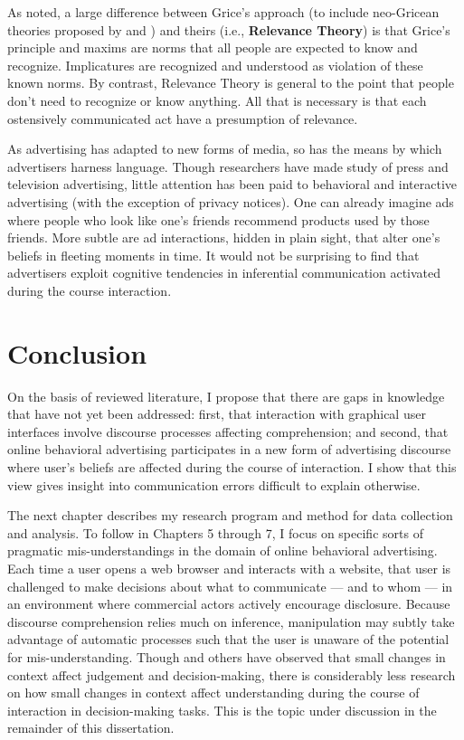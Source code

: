 As  \cite{Sperber:1986uk}  noted, a large difference between Grice's approach (to include neo-Gricean theories proposed by  \citealp{Horn:2006va} and \citealp{Levinson:2000ud})  and theirs  (i.e., \textbf{Relevance Theory})  is that Grice's principle and maxims are norms that all people are expected to know and recognize. Implicatures are recognized and understood as violation of these known norms. By contrast, Relevance Theory is general to the point that people don't need to recognize or know anything. All that is necessary is that each ostensively communicated act have a presumption of relevance.

As advertising has adapted to new forms of media, so has the means by which advertisers harness language. Though researchers have made study of press and television advertising, little attention has been paid to behavioral and interactive advertising (with the exception of privacy notices). One can already imagine ads where people who look like one's friends recommend products used by those friends. More subtle are ad interactions, hidden in plain sight, that alter one's beliefs in fleeting moments in time. It would not be surprising to find that advertisers exploit cognitive tendencies in inferential communication activated during the course interaction.

\section{Conclusion}
\label{conclusion}

On the basis of reviewed literature, I propose that there are gaps in knowledge that have not yet been addressed: first, that interaction with graphical user interfaces involve discourse processes affecting comprehension; and second, that online behavioral advertising participates in a new form of advertising discourse where user's beliefs are affected during the course of interaction. I show that this view gives insight into communication errors difficult to explain otherwise.

\begin{sloppier}
The next chapter describes my research program and method for data collection and analysis. To follow in Chapters 5 through 7, I focus on specific sorts of pragmatic mis-understandings in the domain of online behavioral advertising.  Each time a user opens a web browser and interacts with a website, that user is challenged to make decisions about what to communicate --- and to whom --- in an environment where commercial actors actively encourage disclosure. Because discourse comprehension relies much on inference, manipulation may subtly take advantage of automatic processes such that the user is unaware of the potential for mis-understanding. Though \cite{Kahneman:1984td} and others have observed that small changes in context affect judgement and decision-making, there is considerably less research on how small changes in context affect understanding during the course of interaction in decision-making tasks. This is the topic under discussion in the remainder of this dissertation.
\end{sloppier}

